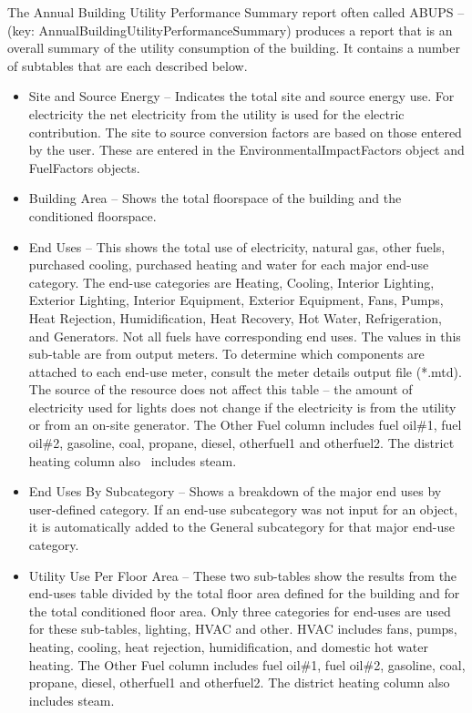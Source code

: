 The Annual Building Utility Performance Summary report often called ABUPS -- (key: AnnualBuildingUtilityPerformanceSummary) produces a report that is an overall summary of the utility consumption of the building. It contains a number of subtables that are each described below.

\begin{itemize}
\item
  Site and Source Energy -- Indicates the total site and source energy use. For electricity the net electricity from the utility is used for the electric contribution. The site to source conversion factors are based on those entered by the user. These are entered in the EnvironmentalImpactFactors object and FuelFactors objects.
\item
  Building Area -- Shows the total floorspace of the building and the conditioned floorspace.
\item
  End Uses -- This shows the total use of electricity, natural gas, other fuels, purchased cooling, purchased heating and water for each major end-use category. The end-use categories are Heating, Cooling, Interior Lighting, Exterior Lighting, Interior Equipment, Exterior Equipment, Fans, Pumps, Heat Rejection, Humidification, Heat Recovery, Hot Water, Refrigeration, and Generators. Not all fuels have corresponding end uses. The values in this sub-table are from output meters. To determine which components are attached to each end-use meter, consult the meter details output file (*.mtd). The source of the resource does not affect this table -- the amount of electricity used for lights does not change if the electricity is from the utility or from an on-site generator. The Other Fuel column includes fuel oil\#1, fuel oil\#2, gasoline, coal, propane, diesel, otherfuel1 and otherfuel2. The district heating column also~ includes steam.
\item
  End Uses By Subcategory -- Shows a breakdown of the major end uses by user-defined category. If an end-use subcategory was not input for an object, it is automatically added to the General subcategory for that major end-use category.
\item
  Utility Use Per Floor Area -- These two sub-tables show the results from the end-uses table divided by the total floor area defined for the building and for the total conditioned floor area. Only three categories for end-uses are used for these sub-tables, lighting, HVAC and other. HVAC includes fans, pumps, heating, cooling, heat rejection, humidification, and domestic hot water heating. The Other Fuel column includes fuel oil\#1, fuel oil\#2, gasoline, coal, propane, diesel, otherfuel1 and otherfuel2. The district heating column also~ includes steam.

\end{itemize}
